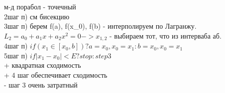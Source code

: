 \documentclass{article}
\begin{document}
\begin{multicols}{2}
м-д порабол - точечный\\
2шаг п) см бисекцию\\
3шаг п) берем f(a), f(x_0), f(b) - интерполируем по Лагранжу.\\
$L_2 = a_0+a_1x+ a_2x^2 = 0 -> x_{1,2}$ - выбираем тот, что из интерваба аб.\\
4шаг п) $if(x_1 \in [x_0, b])? a = x_0, x_0 = x_1 : b = x_0, x_0 = x_1$\\
5шаг п) $if |x_1-x_0| < E ? stop : step 3$ \\
+ квадратная сходимость \\
+ 4 шаг обеспечивает сходимость \\
- шаг 3 очень затратный
\end{multicols}
\end{document}
